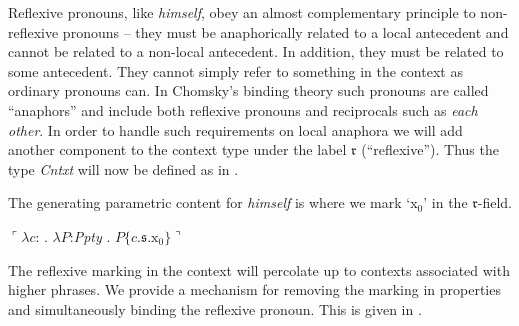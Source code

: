 Reflexive pronouns, like \textit{himself}, obey an almost
complementary principle to non-reflexive pronouns -- they must be
anaphorically related to a local antecedent and cannot be related to a
non-local antecedent.  In addition, they must be related to some
antecedent.  They cannot simply refer to something in the context as
ordinary pronouns can.  In Chomsky's binding theory such pronouns are
called ``anaphors'' and include both reflexive pronouns and
reciprocals such as \textit{each other}.  In order to handle such
requirements on local anaphora we will add another component to the
context type under the label $\mathfrak{r}$ (``reflexive''). Thus the
type \textit{Cntxt} will  now be defined as in \nexteg{}.
\begin{ex} 
\end{ex}
The generating parametric content for \textit{himself} is \nexteg{}
where we mark `x$_0$' in the $\mathfrak{r}$-field.
\begin{ex} 
  $\ulcorner\lambda c$: . $\lambda
  P$:\textit{Ppty} . $P\{c.\mathfrak{s}.\text{x}_0\}\urcorner$
\end{ex}
The reflexive marking in the context will percolate up to contexts
associated with higher phrases.  We provide a mechanism for removing
the marking in properties and simultaneously binding the reflexive
pronoun.  This is given in \nexteg{}.



